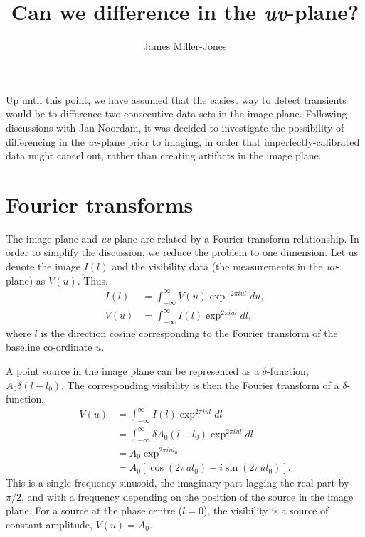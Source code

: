 \documentclass{article}
\begin{document}
\title{Can we difference in the {\it uv}-plane?}
\author{James Miller-Jones}
\maketitle

Up until this point, we have assumed that the easiest way to detect
transients would be to difference two consecutive data sets in the
image plane.  Following discussions with Jan Noordam, it was decided
to investigate the possibility of differencing in the {\it uv}-plane
prior to imaging, in order that imperfectly-calibrated data might
cancel out, rather than creating artifacts in the image plane.

\section{Fourier transforms}
The image plane and {\it uv}-plane are related by a Fourier transform
relationship.  In order to simplify the discussion, we reduce the
problem to one dimension.  Let us denote the image $I(l)$ and the
visibility data (the measurements in the {\it uv}-plane) as $V(u)$.
Thus,
\begin{align}
I(l) &= \int^{\infty}_{-\infty}V(u)\exp^{-2\pi iul}du,\\
V(u) &= \int^{\infty}_{-\infty}I(l)\exp^{2\pi iul}dl,
\end{align}
where $l$ is the direction cosine corresponding to the Fourier
transform of the baseline co-ordinate $u$.

A point source in the image plane can be represented as a
$\delta$-function, $A_0\delta(l-l_0)$.  The corresponding visibility is
then the Fourier transform of a $\delta$-function,
\begin{equation}
\begin{split}
V(u) &= \int^{\infty}_{-\infty}I(l)\exp^{2\pi iul}dl\\
&= \int^{\infty}_{-\infty}\delta A_0(l-l_0) \exp^{2\pi iul}dl\\
&= A_0 \exp^{2\pi iul_0}\\
&= A_0[\cos(2\pi ul_0) + i\sin(2\pi ul_0)].
\end{split}
\end{equation}
This is a single-frequency sinusoid, the imaginary part lagging the
real part by $\pi/2$, and with a frequency depending on the position
of the source in the image plane.  For a source at the phase centre
($l=0$), the visibility is a source of constant amplitude, $V(u)=A_0$.
\end{document}
